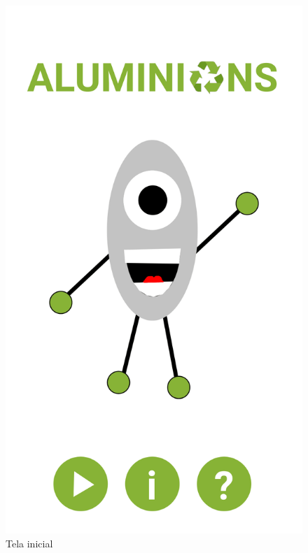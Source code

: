 \documentclass[]{scrartcl}
\begin{document}
\begin{figure}[H]
	\begin{center}
		\includegraphics[scale=0.3]{figs/Game Design-03.png}
		\caption{Tela inicial}
	\end{center}
\end{figure}
\end{document}
